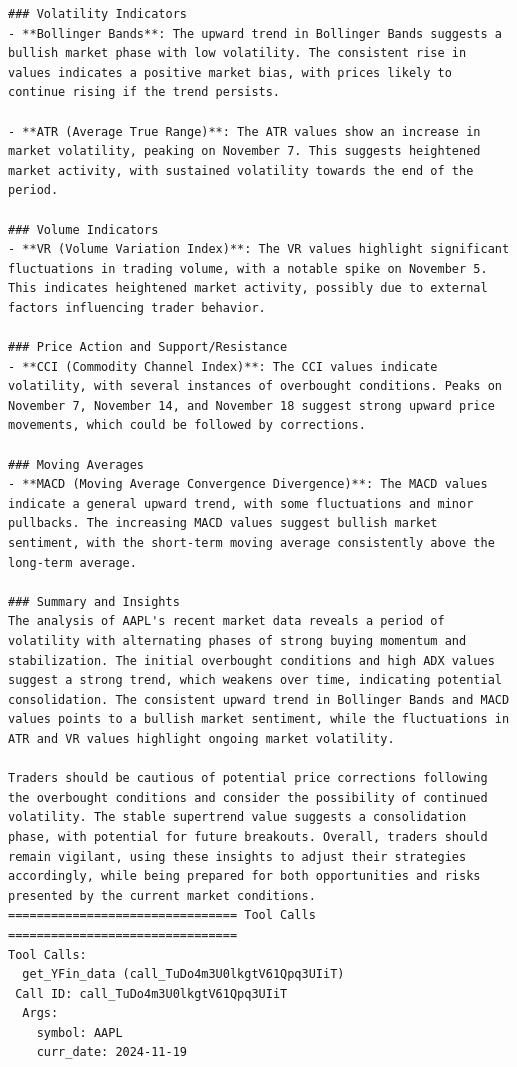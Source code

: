 \begin{tcolorbox}
\begin{lstlisting}[style=agentbase]
### Volatility Indicators
- **Bollinger Bands**: The upward trend in Bollinger Bands suggests a bullish market phase with low volatility. The consistent rise in values indicates a positive market bias, with prices likely to continue rising if the trend persists.

- **ATR (Average True Range)**: The ATR values show an increase in market volatility, peaking on November 7. This suggests heightened market activity, with sustained volatility towards the end of the period.

### Volume Indicators
- **VR (Volume Variation Index)**: The VR values highlight significant fluctuations in trading volume, with a notable spike on November 5. This indicates heightened market activity, possibly due to external factors influencing trader behavior.

### Price Action and Support/Resistance
- **CCI (Commodity Channel Index)**: The CCI values indicate volatility, with several instances of overbought conditions. Peaks on November 7, November 14, and November 18 suggest strong upward price movements, which could be followed by corrections.

### Moving Averages
- **MACD (Moving Average Convergence Divergence)**: The MACD values indicate a general upward trend, with some fluctuations and minor pullbacks. The increasing MACD values suggest bullish market sentiment, with the short-term moving average consistently above the long-term average.

### Summary and Insights
The analysis of AAPL's recent market data reveals a period of volatility with alternating phases of strong buying momentum and stabilization. The initial overbought conditions and high ADX values suggest a strong trend, which weakens over time, indicating potential consolidation. The consistent upward trend in Bollinger Bands and MACD values points to a bullish market sentiment, while the fluctuations in ATR and VR values highlight ongoing market volatility.

Traders should be cautious of potential price corrections following the overbought conditions and consider the possibility of continued volatility. The stable supertrend value suggests a consolidation phase, with potential for future breakouts. Overall, traders should remain vigilant, using these insights to adjust their strategies accordingly, while being prepared for both opportunities and risks presented by the current market conditions.
================================ Tool Calls ================================
Tool Calls:
  get_YFin_data (call_TuDo4m3U0lkgtV61Qpq3UIiT)
 Call ID: call_TuDo4m3U0lkgtV61Qpq3UIiT
  Args:
    symbol: AAPL
    curr_date: 2024-11-19


\end{lstlisting}
\end{tcolorbox}

